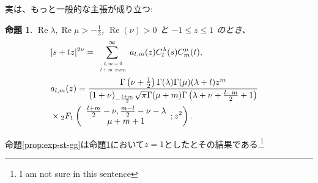 \documentclass[pdf,notes]{beamer}
\newcommand{\tmop}[1]{\ensuremath{\operatorname{#1}}}
\newtheorem{prop}{命題}
\begin{document}
\begin{frame}
	実は、もっと一般的な主張が成り立つ:
	\begin{prop}\label{prop:exp-stz-gg}
		  \label{thm:4}$\tmop{Re} \lambda, \tmop{Re} \mu > - \frac{1}{2}$,
		    $\tmop{Re} (\nu) > 0$ と $-1 \leqslant z \leqslant 1$ のとき、
		      \begin{eqnarray}
			      & | s + t z |^{2 \nu}  = \sum_{\scalebox{0.6}{
				      $\begin{array}[]{c}
						  \ell,m=0\\l + m\mbox{ :even}
					  \end{array}
				  $}}^{\infty} a_{l, m}
					          (z) C_l^{\lambda} (s) C_m^{\mu} (t), &  \nonumber\\
						      & a_{l, m} (z) = \frac{\Gamma \left( \nu + \frac{1}{2} \right) \Gamma
						      (\lambda) \Gamma (\mu) (\lambda + l) z^m }{(1 + \nu)_{- \frac{l + m}{2}} \sqrt{\pi} \Gamma
										      (\mu + m) \Gamma \left( \lambda + \nu + \frac{l - m}{2} + 1 \right)}&\nonumber
										      \\&\times{}_2 F_1 \left( \begin{array}{c}
								        \frac{l + m}{2} - \nu, \frac{m - l}{2} - \nu - \lambda\\
									      \mu + m + 1
									          \end{array} ; z^2 \right). & 
										          \nonumber
											    \end{eqnarray}
    \end{prop}
    命題\ref{prop:exp-st-gg}は命題\ref{prop:exp-stz-gg}において$z=1$としたとその結果である.\footnote{I am not sure in this sentence}
\end{frame}
\end{document}
